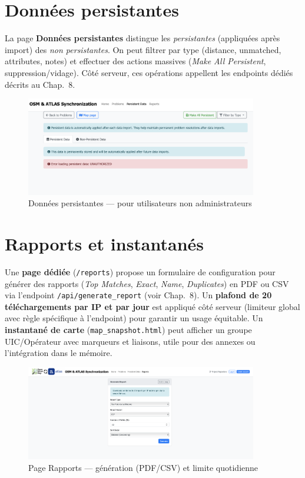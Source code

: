 \section{Données persistantes}

La page \textbf{Données persistantes} distingue les \textit{persistantes} (appliquées après import) des \textit{non persistantes}. On peut filtrer par type (distance, unmatched, attributes, notes) et effectuer des actions massives (\textit{Make All Persistent}, suppression/vidage). Côté serveur, ces opérations appellent les endpoints dédiés décrits au Chap.~8.

\begin{figure}[h]
  \centering
  \includegraphics[width=0.9\textwidth]{../figures/chap9/non admin persisten data page.png}
  \caption{Données persistantes — pour utilisateurs non administrateurs}
  \label{fig:frontend-persistent}
\end{figure}

\section{Rapports et instantanés}
\label{subsec:rapports}

Une \textbf{page dédiée} (\texttt{/reports}) propose un formulaire de configuration pour générer des rapports (\textit{Top Matches}, \textit{Exact}, \textit{Name}, \textit{Duplicates}) en PDF ou CSV via l'endpoint \texttt{/api/generate\_report} (voir Chap.~8). Un \textbf{plafond de 20 téléchargements par IP et par jour} est appliqué côté serveur (limiteur global avec règle spécifique à l'endpoint) pour garantir un usage équitable. Un \textbf{instantané de carte} (\texttt{map\_snapshot.html}) peut afficher un groupe UIC/Opérateur avec marqueurs et liaisons, utile pour des annexes ou l'intégration dans le mémoire.

\begin{figure}[h]
  \centering
  \includegraphics[width=0.9\textwidth]{../figures/chap9/download reports page.png}
  \caption{Page Rapports — génération (PDF/CSV) et limite quotidienne}
  \label{fig:frontend-report}
\end{figure}

